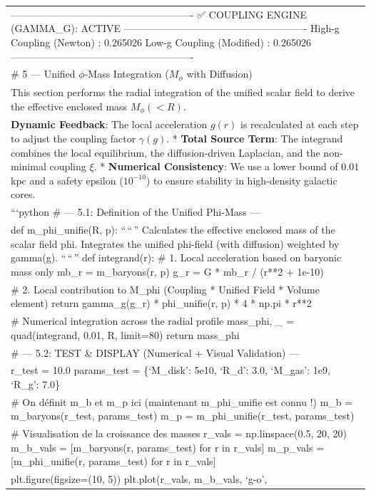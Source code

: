 \documentclass[
]{article}
\begin{document}
{\begin{longtable}[]{@{}
  >{\raggedright\arraybackslash}p{}@{}}
------------------------------------------------------- ✅ COUPLING
ENGINE (GAMMA\_G): ACTIVE
------------------------------------------------------- High-g Coupling
(Newton) : 0.265026 Low-g Coupling (Modified) : 0.265026
------------------------------------------------------- \\
\# 5 --- Unified \(\phi\)-Mass Integration (\(M_{\phi}\) with
Diffusion) \\
This section performs the radial integration of the unified scalar field
to derive the effective enclosed mass \(M_{\phi}(<R)\). \\
* \textbf{Dynamic Feedback}: The local acceleration \(g(r)\) is
recalculated at each step to adjust the coupling factor \(\gamma(g)\). *
\textbf{Total Source Term}: The integrand combines the local
equilibrium, the diffusion-driven Laplacian, and the non-minimal
coupling \(\xi\). * \textbf{Numerical Consistency}: We use a lower bound
of \(0.01\) kpc and a safety epsilon (\(10^{-10}\)) to ensure stability
in high-density galactic cores. \\
```python \# --- 5.1: Definition of the Unified Phi-Mass --- \\
def m\_phi\_unifie(R, p): ``\,``\,'' Calculates the effective enclosed
mass of the scalar field phi. Integrates the unified phi-field (with
diffusion) weighted by gamma(g). ``\,``\,'' def integrand(r): \# 1.
Local acceleration based on baryonic mass only mb\_r = m\_baryons(r, p)
g\_r = G * mb\_r / (r**2 + 1e-10) \\
\# 2. Local contribution to M\_phi (Coupling * Unified Field * Volume
element) return gamma\_g(g\_r) * phi\_unifie(r, p) * 4 * np.pi * r**2 \\
\# Numerical integration across the radial profile mass\_phi, \_ =
quad(integrand, 0.01, R, limit=80) return mass\_phi \\
\# --- 5.2: TEST \& DISPLAY (Numerical + Visual Validation) --- \\
r\_test = 10.0 params\_test = \{`M\_disk': 5e10, `R\_d': 3.0, `M\_gas':
1e9, `R\_g': 7.0\} \\
\# On définit m\_b et m\_p ici (maintenant m\_phi\_unifie est connu !)
m\_b = m\_baryons(r\_test, params\_test) m\_p = m\_phi\_unifie(r\_test,
params\_test) \\
\# Visualisation de la croissance des masses r\_vals = np.linspace(0.5,
20, 20) m\_b\_vals = {[}m\_baryons(r, params\_test) for r in r\_vals{]}
m\_p\_vals = {[}m\_phi\_unifie(r, params\_test) for r in r\_vals{]} \\
plt.figure(figsize=(10, 5)) plt.plot(r\_vals, m\_b\_vals, `g-o',

\end{longtable}}
\end{document}
